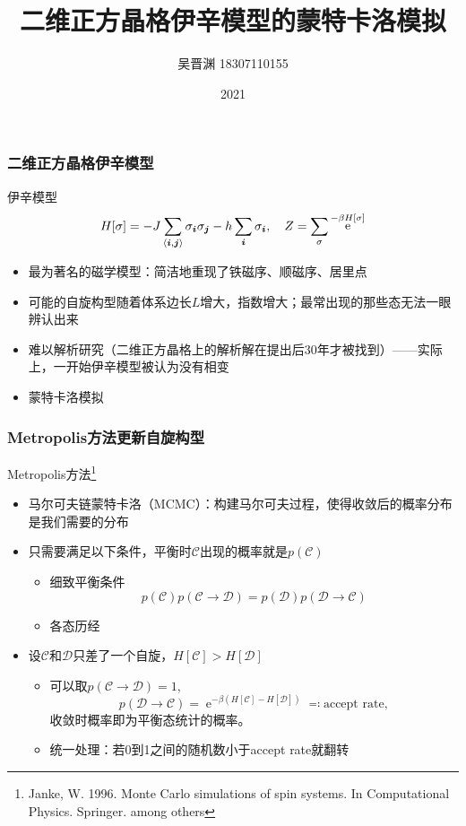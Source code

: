 \documentclass[UTF8]{ctexbeamer}
\title{二维正方晶格伊辛模型的蒙特卡洛模拟}
\author{吴晋渊 18307110155}
\institute{复旦大学物理学系}
\date{2021}
\DeclareMathOperator{\ee}{e}
\begin{document}
\frame{\titlepage}

\begin{frame}
\frametitle{二维正方晶格伊辛模型}

伊辛模型
\begin{equation}
    H[\sigma] = - J \sum_{\langle \vb*{i}, \vb*{j} \rangle} \sigma_{\vb*{i}} \sigma_{\vb*{j}} - h \sum_{\vb*{i}} \sigma_{\vb*{i}}, \quad Z = \sum_\sigma \ee^{- \beta H[\sigma]}
\end{equation}    
\begin{itemize}
    \item 最为著名的磁学模型：简洁地重现了铁磁序、顺磁序、居里点
    \item 可能的自旋构型随着体系边长$L$增大，指数增大；最常出现的那些态无法一眼辨认出来
    \item 难以解析研究（二维正方晶格上的解析解在提出后30年才被找到）——实际上，一开始伊辛模型被认为没有相变
    \item 蒙特卡洛模拟
\end{itemize}

\end{frame}

\begin{frame}
\frametitle{Metropolis方法更新自旋构型}

Metropolis方法\footnote{Janke, W. 1996. Monte Carlo simulations of spin systems. In Computational Physics. Springer. among others}
\begin{itemize}
    \item 马尔可夫链蒙特卡洛（MCMC）：构建马尔可夫过程，使得收敛后的概率分布是我们需要的分布
    \item 只需要满足以下条件，平衡时$\mathcal{C}$出现的概率就是$p(\mathcal{C})$
    \begin{itemize}
        \item 细致平衡条件
        \begin{equation}
            p(\mathcal{C}) p(\mathcal{C} \to \mathcal{D}) = p(\mathcal{D}) p(\mathcal{D} \to \mathcal{C})
        \end{equation} 
        \item 各态历经
    \end{itemize}
    \item 设$\mathcal{C}$和$\mathcal{D}$只差了一个自旋，$H[\mathcal{C}] > H[\mathcal{D}]$
    \begin{itemize}
        \item 可以取$p(\mathcal{C} \to \mathcal{D}) = 1$, 
        \begin{equation}
            p(\mathcal{D} \to \mathcal{C}) = \ee^{- \beta (H[\mathcal{C}] - H[\mathcal{D}])} \eqqcolon \text{accept rate},
        \end{equation}
        收敛时概率即为平衡态统计的概率。
        \item 统一处理：若0到1之间的随机数小于accept rate就翻转
    \end{itemize} 
\end{itemize}
\end{frame}
\end{document}
